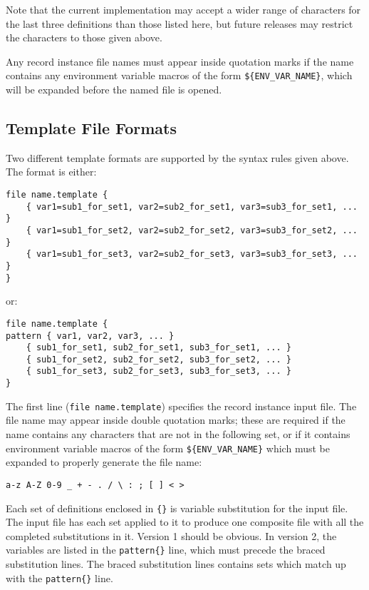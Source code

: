 Note that the current implementation may accept a wider range of characters for the last three definitions than those listed here, but future releases may restrict the characters to those given above.

Any record instance file names must appear inside quotation marks if the name contains any environment variable macros of the form \verb|${ENV_VAR_NAME}|, which will be expanded before the named file is opened.

\subsection{Template File Formats}

Two different template formats are supported by the syntax rules given above.
The format is either:

\begin{verbatim}
file name.template {
    { var1=sub1_for_set1, var2=sub2_for_set1, var3=sub3_for_set1, ... }
    { var1=sub1_for_set2, var2=sub2_for_set2, var3=sub3_for_set2, ... }
    { var1=sub1_for_set3, var2=sub2_for_set3, var3=sub3_for_set3, ... }
}
\end{verbatim}

or:

\begin{verbatim}
file name.template {
pattern { var1, var2, var3, ... }
    { sub1_for_set1, sub2_for_set1, sub3_for_set1, ... }
    { sub1_for_set2, sub2_for_set2, sub3_for_set2, ... }
    { sub1_for_set3, sub2_for_set3, sub3_for_set3, ... }
}
\end{verbatim}

The first line (\verb|file name.template|) specifies the record instance input file. The file name may appear inside double
quotation marks; these are required if the name contains any characters that are not in the following set, or if it contains
environment variable macros of the form \verb|${ENV_VAR_NAME}| which must be expanded to properly generate the file name:

\begin{verbatim}
a-z A-Z 0-9 _ + - . / \ : ; [ ] < >
\end{verbatim}

Each set of definitions enclosed in \verb|{}| is variable substitution for the input file. The input file has each set applied to it to
produce one composite file with all the completed substitutions in it. Version 1 should be obvious. In version 2, the
variables are listed in the \verb|pattern{}| line, which must precede the braced substitution lines. The braced substitution
lines contains sets which match up with the \verb|pattern{}| line.

